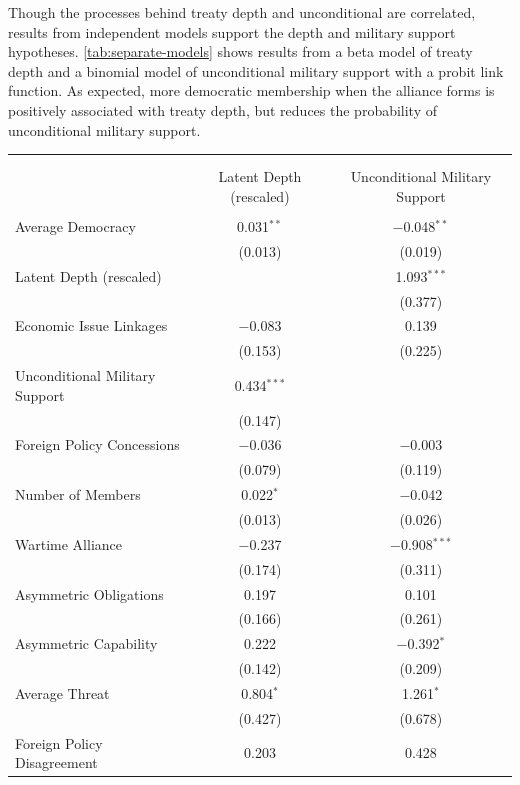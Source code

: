 \documentclass[12pt]{article}
\begin{document}
Though the processes behind treaty depth and unconditional are correlated, results from independent models support the depth and military support hypotheses. 
\autoref{tab:separate-models} shows results from a beta model of treaty depth and a binomial model of unconditional military support with a probit link function. 
As expected, more democratic membership when the alliance forms is positively associated with treaty depth, but reduces the probability of unconditional military support. 


\begin{table}[!htbp] \centering 
\begin{tabular}{@{\extracolsep{5pt}}lcc} 
\\[-1.8ex]\hline \\[-1.8ex] 
\\[-1.8ex] & Latent Depth (rescaled) & Unconditional Military Support \\ 
\hline \\[-1.8ex] 
 Average Democracy & 0.031$^{**}$ & $-$0.048$^{**}$ \\ 
  & (0.013) & (0.019) \\ 
  Latent Depth (rescaled) &  & 1.093$^{***}$ \\ 
  &  & (0.377) \\ 
  Economic Issue Linkages & $-$0.083 & 0.139 \\ 
  & (0.153) & (0.225) \\ 
  Unconditional Military Support & 0.434$^{***}$ &  \\ 
  & (0.147) &  \\ 
  Foreign Policy Concessions & $-$0.036 & $-$0.003 \\ 
  & (0.079) & (0.119) \\ 
  Number of Members & 0.022$^{*}$ & $-$0.042 \\ 
  & (0.013) & (0.026) \\ 
  Wartime Alliance & $-$0.237 & $-$0.908$^{***}$ \\ 
  & (0.174) & (0.311) \\ 
  Asymmetric Obligations & 0.197 & 0.101 \\ 
  & (0.166) & (0.261) \\ 
  Asymmetric Capability & 0.222 & $-$0.392$^{*}$ \\ 
  & (0.142) & (0.209) \\ 
  Average Threat & 0.804$^{*}$ & 1.261$^{*}$ \\ 
  & (0.427) & (0.678) \\ 
  Foreign Policy Disagreement & 0.203 & 0.428 \\ 

\end{tabular}
\end{table}
\end{document}
